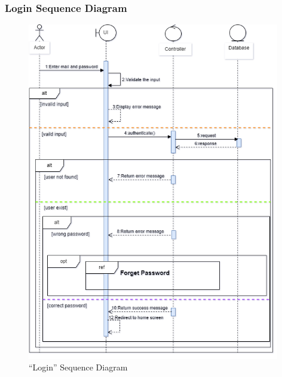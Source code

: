 \subsubsection{Login Sequence Diagram}
\begin{figure}[H]
\includegraphics[width=0.98\textwidth]{images/chap2/AuthSeq_c.png}
    \caption{“Login” Sequence Diagram}
    \label{fig:enter-label}
\end{figure}

